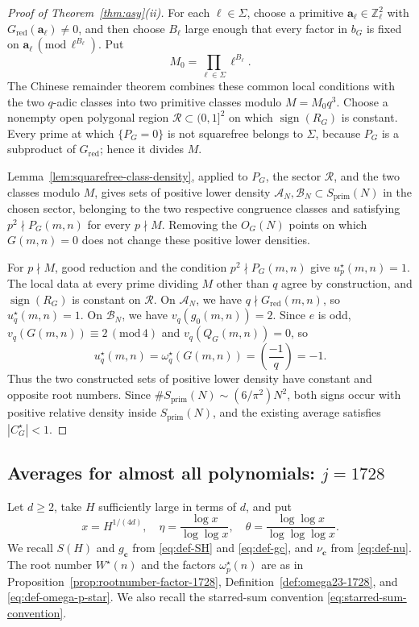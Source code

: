 \documentclass[12pt,reqno]{amsart}
\numberwithin{equation}{section}
\theoremstyle{definition}
\renewcommand{\ge}{\geqslant}
\newcommand{\ZZ}{\mathbb{Z}}
\newcommand{\cc}{\mathbf{c}}
\DeclareMathOperator{\sign}{sign}
\newcommand{\rw}{W}
\renewcommand{\pmod}[1]{\,(\mathrm{mod}\,#1)}
\begin{document}
\begin{proof}[Proof of Theorem~\ref{thm:asy}(ii)]
For each $\ell\in\Sigma$, choose a primitive $\mathbf a_\ell\in\ZZ_\ell^2$ with $G_{\mathrm{red}}(\mathbf a_\ell)\ne0$, and then choose $B_\ell$ large enough that every factor in $b_G$ is fixed on $\mathbf a_\ell\pmod{\ell^{B_\ell}}$.
Put
\[
M_0=\prod_{\ell\in\Sigma}\ell^{B_\ell}.
\]
The Chinese remainder theorem combines these common local conditions with the two $q$-adic classes into two primitive classes modulo $M=M_0q^3$.
Choose a nonempty open polygonal region $\mathcal R\subset(0,1]^2$ on which $\sign(R_G)$ is constant.
Every prime at which $\{P_G=0\}$ is not squarefree belongs to $\Sigma$, because $P_G$ is a subproduct of $G_{\mathrm{red}}$; hence it divides $M$.

Lemma~\ref{lem:squarefree-class-density}, applied to $P_G$, the sector $\mathcal R$, and the two classes modulo $M$, gives sets of positive lower density $\mathcal A_N,\mathcal B_N\subset S_{\mathrm{prim}}(N)$ in the chosen sector, belonging to the two respective congruence classes and satisfying $p^2\nmid P_G(m,n)$ for every $p\nmid M$.
Removing the $O_G(N)$ points on which $G(m,n)=0$ does not change these positive lower densities.

For $p\nmid M$, good reduction and the condition $p^2\nmid P_G(m,n)$ give $u_p^\star(m,n)=1$.
The local data at every prime dividing $M$ other than $q$ agree by construction, and $\sign(R_G)$ is constant on $\mathcal R$.
On $\mathcal A_N$, we have $q\nmid G_{\mathrm{red}}(m,n)$, so $u_q^\star(m,n)=1$.
On $\mathcal B_N$, we have $v_q(g_0(m,n))=2$.
Since $e$ is odd, $v_q(G(m,n))\equiv2\pmod4$ and $v_q(Q_G(m,n))=0$, so
\[
u_q^\star(m,n)=\omega_q^\star(G(m,n))
=\left(\frac{-1}{q}\right)=-1.
\]
Thus the two constructed sets of positive lower density have constant and opposite root numbers.
Since $\#S_{\mathrm{prim}}(N)\sim(6/\pi^2)N^2$, both signs occur with positive relative density inside $S_{\mathrm{prim}}(N)$, and the existing average satisfies $|C_G^\star|<1$.
\end{proof}

\subsection{Averages for almost all polynomials: \texorpdfstring{$j=1728$}{j=1728}}

Let $d\ge2$, take $H$ sufficiently large in terms of $d$, and put
\[
x=H^{1/(4d)},\quad
\eta=\frac{\log x}{\log\log x},\quad
\theta=\frac{\log\log x}{\log\log\log x}.
\]
We recall $S(H)$ and $g_\cc$ from \eqref{eq:def-SH} and \eqref{eq:def-gc}, and $\nu_\cc$ from \eqref{eq:def-nu}.
The root number $\rw^\star(n)$ and the factors $\omega_p^\star(n)$ are as in Proposition~\ref{prop:rootnumber-factor-1728}, Definition~\ref{def:omega23-1728}, and \eqref{eq:def-omega-p-star}.
We also recall the starred-sum convention \eqref{eq:starred-sum-convention}.
\end{document}

